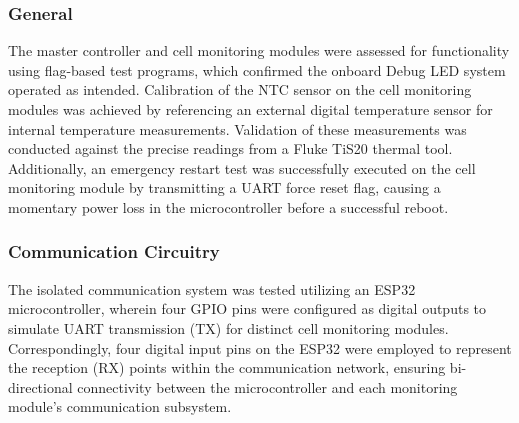 \subsubsection{General}\label{subsec:genZ}
The master controller and cell monitoring modules were assessed for functionality using flag-based test programs, which confirmed the onboard Debug LED system operated as intended. Calibration of the NTC sensor on the cell monitoring modules was achieved by referencing an external digital temperature sensor for internal temperature measurements. Validation of these measurements was conducted against the precise readings from a Fluke TiS20 thermal tool. Additionally, an emergency restart test was successfully executed on the cell monitoring module by transmitting a UART force reset flag, causing a momentary power loss in the microcontroller before a successful reboot.
\subsubsection{Communication Circuitry}\label{subsec:CCT}
The isolated communication system was tested utilizing an ESP32 microcontroller, wherein four GPIO pins were configured as digital outputs to simulate UART transmission (TX) for distinct cell monitoring modules. Correspondingly, four digital input pins on the ESP32 were employed to represent the reception (RX) points within the communication network, ensuring bi-directional connectivity between the microcontroller and each monitoring module's communication subsystem.


